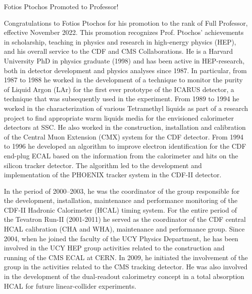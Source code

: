 \begin{multicols*}{2}
  \begin{headline}[enhanced, tikz={rotate=0}]{Fotios Ptochos Promoted to Professor!}
    \begin{multicols}{2}
    Congratulations to Fotios Ptochos for his promotion to the rank of
    Full Professor, effective November 2022. This promotion recognizes
    Prof. Ptochos' achievements in scholarship, teaching in physics and research in
    high-energy physics (HEP), and his overall service to the CDF and CMS
    Collaborations. He is a Harvard University PhD in physics
    graduate (1998) and has been active in HEP-research, both in detector
    development and physics analyses since 1987. In particular, from 1987
    to 1988 he worked in the development of a technique to monitor the
    purity of Liquid Argon (LAr) for the first ever prototype of the
    ICARUS detector, a technique that was subsequently used in the
    experiment. From 1989 to 1994 he worked in the characterization of
    various Tetramethyl liquids as part of a research project to find
    appropriate warm liquids media for the envisioned calorimeter
    detectors at SSC. He also worked in the construction, installation and
    calibration of the Central Muon Extension (CMX) system for the CDF
    detector. From 1994 to 1996 he developed an algorithm to improve
    electron identification for the CDF end-plug ECAL based on the
    information from the calorimeter and hits on the silicon tracker
    detector. The algorithm led to the development and implementation of
    the PHOENIX tracker system in the CDF-II detector. 
    
    In the period of 2000–2003, he was the coordinator of the group
    responsible for the development, installation, maintenance and
    performance monitoring of the CDF-II Hadronic Calorimeter (HCAL)
    timing system. For the entire period of the Tevatron Run-II
    (2001-2011) he served as the coordinator of the CDF central HCAL
    calibration (CHA and WHA), maintenance and performance group. Since
    2004, when he joined the faculty of the UCY Physics Department, he has
    been involved in the UCY HEP group activities related to the
    construction and running of the CMS ECAL at CERN. In 2009, he
    initiated the involvement of the group in the activities related to
    the CMS tracking detector. He was also involved in the development of
    the dual-readout calorimetry concept in a total absorption HCAL for
    future linear-collider experiments. 
    \columnbreak


\end{multicols}
\end{headline}
\end{multicols*}
